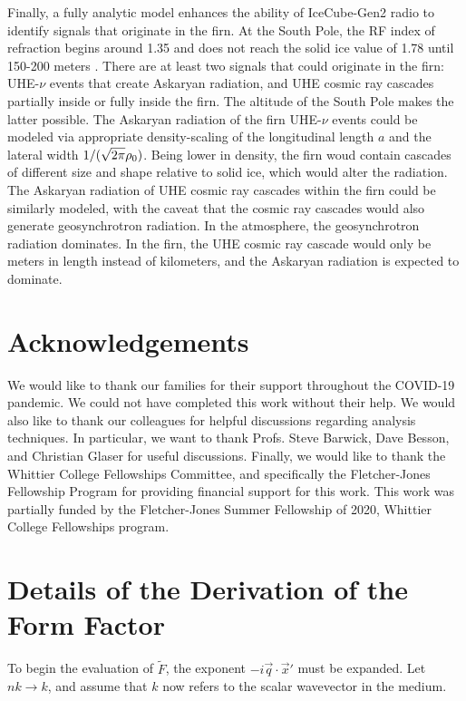 \documentclass[amsmath,amssymb,aps,prd,10pt,twocolumn]{revtex4}
\begin{document}
Finally, a fully analytic model enhances the ability of IceCube-Gen2 radio to identify signals that originate in the firn.  At the South Pole, the RF index of refraction begins around 1.35 and does not reach the solid ice value of 1.78 until 150-200 meters \cite{Barwick:2018497}.  There are at least two signals that could originate in the firn: UHE-$\nu$ events that create Askaryan radiation, and UHE cosmic ray cascades partially inside or fully inside the firn.  The altitude of the South Pole makes the latter possible.  The Askaryan radiation of the firn UHE-$\nu$ events could be modeled via appropriate density-scaling of the longitudinal length $a$ and the lateral width $1/(\sqrt{2\pi} \rho_{\rm 0})$.  Being lower in density, the firn woud contain cascades of different size and shape relative to solid ice, which would alter the radiation.  The Askaryan radiation of UHE cosmic ray cascades within the firn could be similarly modeled, with the caveat that the cosmic ray cascades would also generate geosynchrotron radiation.  In the atmosphere, the geosynchrotron radiation dominates.  In the firn, the UHE cosmic ray cascade would only be meters in length instead of kilometers, and the Askaryan radiation is expected to dominate.

\section{Acknowledgements}

We would like to thank our families for their support throughout the COVID-19 pandemic.  We could not have completed this work without their help.  We would also like to thank our colleagues for helpful discussions regarding analysis techniques.  In particular, we want to thank Profs. Steve Barwick, Dave Besson, and Christian Glaser for useful discussions.  Finally, we would like to thank the Whittier College Fellowships Committee, and specifically the Fletcher-Jones Fellowship Program for providing financial support for this work.  This work was partially funded by the Fletcher-Jones Summer Fellowship of 2020, Whittier College Fellowships program.

\appendix

\section{Details of the Derivation of the Form Factor}
\label{app:f}

To begin the evaluation of $\widetilde{F}$, the exponent $-i \vec{q} \cdot \vec{x}'$ must be expanded.  Let $nk \rightarrow k$, and assume that $k$ now refers to the scalar wavevector in the medium.
\end{document}
